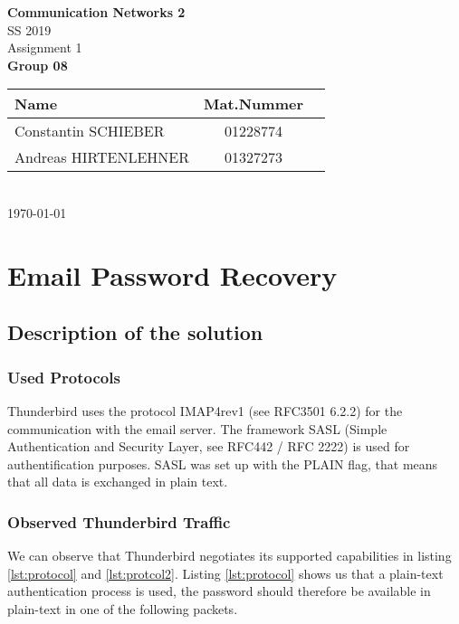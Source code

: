 \documentclass[parskip=full]{scrartcl}
\begin{document}
\begin{titlepage}
    \centering
    \vspace*{2cm}
    {\Huge \textbf{Communication Networks 2}}\\
    SS 2019\\
    \vspace*{1cm}
    {\Large Assignment 1}
    \\\vspace*{3cm}
    {\Large \textbf{Group 08}}\\
    \vspace*{1cm}
    {\large 
        \begin{tabular}{l c c}
            Name & Mat.Nummer \\ \hline
            Constantin SCHIEBER & 01228774 \\
            Andreas HIRTENLEHNER & 01327273
        \end{tabular}
    }
    \\\vspace*{7cm}
    \today
\end{titlepage}

\section{Email Password Recovery}

\subsection{Description of the solution}

\subsubsection{Used Protocols}
Thunderbird uses the protocol IMAP4rev1 (see RFC3501 6.2.2) for the communication with the email server.
The framework SASL (Simple Authentication and Security Layer, see RFC442 / RFC 2222) is used for authentification purposes.
SASL was set up with the PLAIN flag, that means that all data is exchanged in plain text.

\subsubsection{Observed Thunderbird Traffic}
We can observe that Thunderbird negotiates its supported capabilities in listing \ref{lst:protocol} and \ref{lst:protcol2}.
Listing \ref{lst:protocol} shows us that a plain-text authentication process is used, the password should therefore be available in plain-text in one of the following packets.
\end{document}
